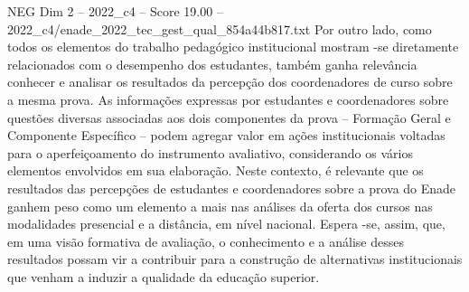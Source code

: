 \begin{textsample}{NEG Dim 2 – 2022\_c4 – Score 19.00 – 2022\_c4/enade\_2022\_tec\_gest\_qual\_854a44b817.txt}
Por outro lado, como todos os elementos do trabalho pedagógico institucional mostram -se diretamente relacionados com o desempenho dos estudantes, também ganha relevância conhecer e analisar os resultados da percepção dos coordenadores de curso sobre a mesma prova.
As informações expressas por estudantes e coordenadores sobre questões diversas associadas aos dois componentes da prova – Formação Geral e Componente Específico – podem agregar valor em ações institucionais voltadas para o aperfeiçoamento do instrumento avaliativo, considerando os vários elementos envolvidos em sua elaboração.
Neste contexto, é relevante que os resultados das percepções de estudantes e coordenadores sobre a prova do Enade ganhem peso como um elemento a mais nas análises da oferta dos cursos nas modalidades presencial e a distância, em nível nacional.
Espera -se, assim, que, em uma visão formativa de avaliação, o conhecimento e a análise desses resultados possam vir a contribuir para a construção de alternativas institucionais que venham a induzir a qualidade da educação superior.

\end{textsample}
